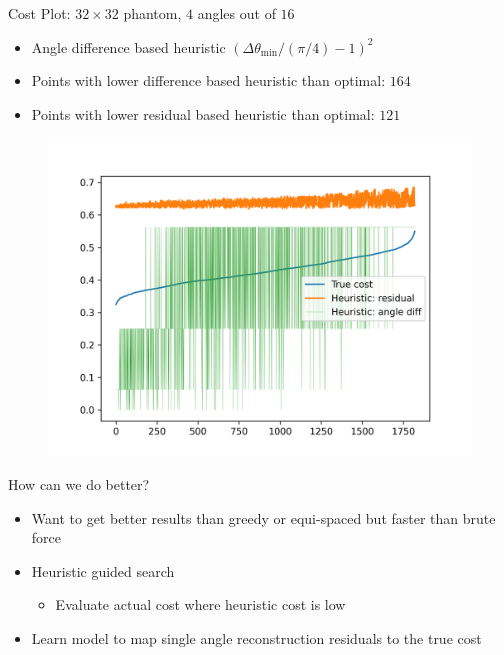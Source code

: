 \documentclass[english,aspectratio=43]{beamer}
\begin{document}
\begin{frame}{Cost Plot: $32 \times 32$ phantom, $4$ angles out of $16$ }
	\begin{itemize}
	    \item Angle difference based heuristic $(\Delta \theta_{\text{min}}/(\pi/4) - 1)^2$
	    \item Points with lower difference based heuristic than optimal: $164$
	    \item Points with lower residual based heuristic than optimal: $121$
        
	\end{itemize}
	
	\begin{figure}
    \includegraphics[scale=0.5]{Figs/cost_comparison2_32-16-4.png}
    \end{figure}
    
\end{frame}

\begin{frame}{How can we do better?}
	\begin{itemize}
	    \setlength\itemsep{2em}
	    
	    \item Want to get better results than greedy or equi-spaced but faster than brute force
		    
		\item Heuristic guided search
	    \begin{itemize}
    		\item Evaluate actual cost where heuristic cost is low
    	\end{itemize}
    	
    	\item Learn model to map single angle reconstruction residuals to the true cost
    	

	\end{itemize}
	
\end{frame}



\end{document}
